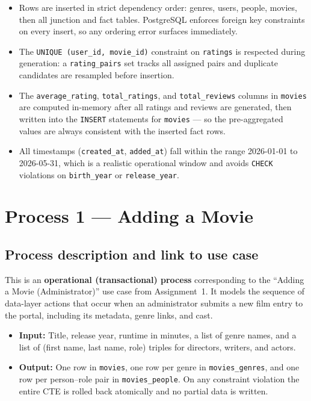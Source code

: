 \documentclass[11pt, a4paper]{article}
\begin{document}
\begin{itemize}
    \item Rows are inserted in strict dependency order: genres, users, people,
    movies, then all junction and fact tables. PostgreSQL enforces foreign key
    constraints on every insert, so any ordering error surfaces immediately.

    \item The \texttt{UNIQUE (user\_id, movie\_id)} constraint on
    \texttt{ratings} is respected during generation: a \texttt{rating\_pairs}
    set tracks all assigned pairs and duplicate candidates are resampled
    before insertion.

    \item The \texttt{average\_rating}, \texttt{total\_ratings}, and
    \texttt{total\_reviews} columns in \texttt{movies} are computed in-memory
    after all ratings and reviews are generated, then written into the
    \texttt{INSERT} statements for \texttt{movies} --- so the pre-aggregated
    values are always consistent with the inserted fact rows.

    \item All timestamps (\texttt{created\_at}, \texttt{added\_at}) fall
    within the range 2026-01-01 to 2026-05-31, which is a realistic
    operational window and avoids \texttt{CHECK} violations on
    \texttt{birth\_year} or \texttt{release\_year}.
\end{itemize}

\newpage
\section{Process 1 --- Adding a Movie}
\label{sec:process1}

\subsection{Process description and link to use case}

This is an \textbf{operational (transactional) process} corresponding to the
``Adding a Movie (Administrator)'' use case from Assignment~1. It models the
sequence of data-layer actions that occur when an administrator submits a new
film entry to the portal, including its metadata, genre links, and cast.

\begin{itemize}
    \item \textbf{Input:} Title, release year, runtime in minutes, a list of
    genre names, and a list of (first name, last name, role) triples for
    directors, writers, and actors.
    \item \textbf{Output:} One row in \texttt{movies}, one row per genre in
    \texttt{movies\_genres}, and one row per person--role pair in
    \texttt{movies\_people}. On any constraint violation the entire CTE is
    rolled back atomically and no partial data is written.
\end{itemize}
\end{document}
